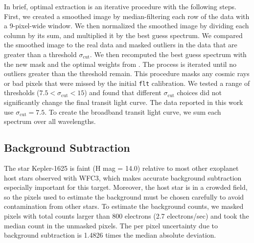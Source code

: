 \documentclass[twocolumn]{aastex62}
\begin{document}
In brief, optimal extraction is an iterative procedure with the following steps. First, we created a smoothed image by median-filtering each row of the data with a 9-pixel-wide window.  We then normalized the smoothed image by dividing each column by its sum, and multiplied it by the best guess spectrum. We compared the smoothed image to the real data and masked outliers in the data that are greater than a threshold $\sigma_\mathrm{cut}$. We then recomputed the best guess spectrum with the new mask and the optimal weights from \cite{horne86}. The process is iterated until no outliers greater than the threshold remain.  This procedure masks any cosmic rays or bad pixels that were missed by the initial \texttt{flt} calibration.  We tested a range of thresholds ($7.5 < \sigma_\mathrm{cut} < 15$) and found that different $\sigma_\mathrm{cut}$ choices did not significantly change the final transit light curve. The data reported in this work use $\sigma_\mathrm{cut} = 7.5$.  To create the broadband transit light curve, we sum each spectrum over all wavelengths. 




\subsection{Background Subtraction} 
\label{sec:background} 
The star Kepler-1625 is faint (H mag = 14.0) relative to most other exoplanet host stars observed with WFC3, which makes accurate background subtraction especially important for this target. Moreover, the host star is in a crowded field, so the pixels used to estimate the background must be chosen carefully to avoid contamination from other stars.  To estimate the background counts, we masked pixels with total counts larger than 800 electrons (2.7 electrons/sec) and took the median count in the unmasked pixels. The per pixel uncertainty due to background subtraction is 1.4826 times the median absolute deviation.


\end{document}
